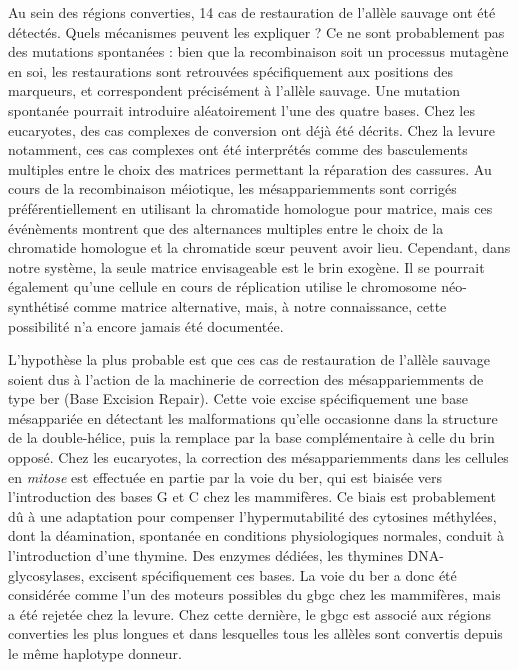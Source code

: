 Au sein des régions converties, 14 cas de restauration de l'allèle sauvage ont
été détectés. Quels mécanismes peuvent les expliquer ? Ce ne sont probablement
pas des mutations spontanées : bien que la recombinaison soit un processus
mutagène en soi\cite{rodgers_error-prone_2016,hicks_increased_2010}, les
restaurations sont retrouvées spécifiquement aux positions des marqueurs, et
correspondent précisément à l'allèle sauvage. Une mutation spontanée pourrait
introduire aléatoirement l'une des quatre bases. Chez les eucaryotes, des cas
complexes de conversion ont déjà été
décrits\cite{martini_genome-wide_2011,yeadon_recombination_2001}. Chez la
levure notamment, ces cas complexes ont été interprétés comme des basculements multiples
entre le choix des matrices permettant la réparation des
cassures\cite{hoffmann_trans_2005}. Au cours de la recombinaison méiotique, les
mésappariemments sont corrigés préférentiellement en utilisant la chromatide
homologue pour matrice, mais ces événèments montrent que des alternances
multiples entre le choix de la chromatide homologue et la chromatide sœur
peuvent avoir lieu. Cependant, dans notre système, la seule matrice envisageable
est le brin exogène. Il se pourrait également qu'une cellule en cours de
réplication utilise le chromosome néo-synthétisé comme matrice alternative,
mais, à notre connaissance, cette possibilité n'a encore jamais été documentée.

L'hypothèse la plus probable est que ces cas de restauration de l'allèle sauvage
soient dus à l'action de la machinerie de correction des mésappariemments de
type \ac{ber} (Base Excision Repair). Cette voie excise spécifiquement une base
mésappariée en détectant les malformations qu'elle occasionne dans la structure
de la double-hélice, puis la remplace par la base complémentaire à celle du brin
opposé\cite{krokan_base_2013}. Chez les eucaryotes, la correction des
mésappariemments dans les cellules en \emph{mitose} est effectuée en partie par
la voie du \ac{ber}, qui est biaisée vers l'introduction des bases G et C chez
les mammifères\cite{brown_specific_1987,brown_different_1988}. Ce biais est
probablement dû à une adaptation pour compenser l'hypermutabilité des cytosines
méthylées, dont la déamination, spontanée en conditions physiologiques normales,
conduit à l'introduction d'une thymine. Des enzymes dédiées, les thymines
DNA-glycosylases, excisent spécifiquement ces bases. La voie du \ac{ber} a donc
été considérée comme l'un des moteurs possibles du \ac{gbgc} chez les
mammifères\cite{duret_biased_2009}, mais a été rejetée chez la
levure\cite{lesecque_gc-biased_2013}. Chez cette dernière, le \ac{gbgc} est
associé aux régions converties les plus longues et dans lesquelles tous les
allèles sont convertis depuis le même haplotype donneur.

